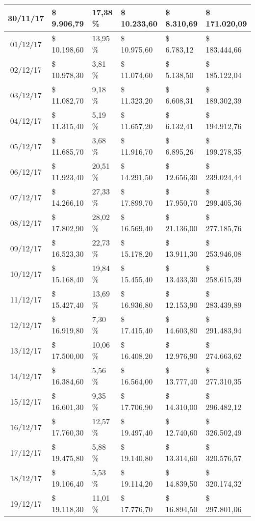 \begin{small}
\begin{longtable}{|c|l|l|l|l|l|}
30/11/17 & \$ 9.906,79 & 17,38 \% & \$ 10.233,60 & \$ 8.310,69 & \$ 171.020,09 \\ \hline
01/12/17 & \$ 10.198,60 & 13,95 \% & \$ 10.975,60 & \$ 6.783,12 & \$ 183.444,66 \\ \hline
02/12/17 & \$ 10.978,30 & 3,81 \% & \$ 11.074,60 & \$ 5.138,50 & \$ 185.122,04 \\ \hline
03/12/17 & \$ 11.082,70 & 9,18 \% & \$ 11.323,20 & \$ 6.608,31 & \$ 189.302,39 \\ \hline
04/12/17 & \$ 11.315,40 & 5,19 \% & \$ 11.657,20 & \$ 6.132,41 & \$ 194.912,76 \\ \hline
05/12/17 & \$ 11.685,70 & 3,68 \% & \$ 11.916,70 & \$ 6.895,26 & \$ 199.278,35 \\ \hline
06/12/17 & \$ 11.923,40 & 20,51 \% & \$ 14.291,50 & \$ 12.656,30 & \$ 239.024,44 \\ \hline
07/12/17 & \$ 14.266,10 & 27,33 \% & \$ 17.899,70 & \$ 17.950,70 & \$ 299.405,36 \\ \hline
08/12/17 & \$ 17.802,90 & 28,02 \% & \$ 16.569,40 & \$ 21.136,00 & \$ 277.185,76 \\ \hline
09/12/17 & \$ 16.523,30 & 22,73 \% & \$ 15.178,20 & \$ 13.911,30 & \$ 253.946,08 \\ \hline
10/12/17 & \$ 15.168,40 & 19,84 \% & \$ 15.455,40 & \$ 13.433,30 & \$ 258.615,39 \\ \hline
11/12/17 & \$ 15.427,40 & 13,69 \% & \$ 16.936,80 & \$ 12.153,90 & \$ 283.439,89 \\ \hline
12/12/17 & \$ 16.919,80 & 7,30 \% & \$ 17.415,40 & \$ 14.603,80 & \$ 291.483,94 \\ \hline
13/12/17 & \$ 17.500,00 & 10,06 \% & \$ 16.408,20 & \$ 12.976,90 & \$ 274.663,62 \\ \hline
14/12/17 & \$ 16.384,60 & 5,56 \% & \$ 16.564,00 & \$ 13.777,40 & \$ 277.310,35 \\ \hline
15/12/17 & \$ 16.601,30 & 9,35 \% & \$ 17.706,90 & \$ 14.310,00 & \$ 296.482,12 \\ \hline
16/12/17 & \$ 17.760,30 & 12,57 \% & \$ 19.497,40 & \$ 12.740,60 & \$ 326.502,49 \\ \hline
17/12/17 & \$ 19.475,80 & 5,88 \% & \$ 19.140,80 & \$ 13.314,60 & \$ 320.576,57 \\ \hline
18/12/17 & \$ 19.106,40 & 5,53 \% & \$ 19.114,20 & \$ 14.839,50 & \$ 320.174,32 \\ \hline
19/12/17 & \$ 19.118,30 & 11,01 \% & \$ 17.776,70 & \$ 16.894,50 & \$ 297.801,06 \\ \hline

\end{longtable}
\end{small}
